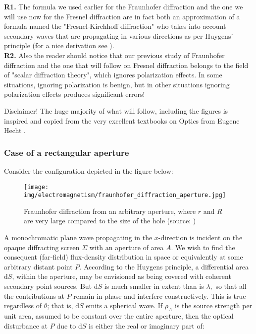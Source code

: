 	\begin{tcolorbox}[title=Remarks,colframe=black,arc=10pt]
	\textbf{R1.} The formula we used earlier for the Fraunhofer diffraction and the one we will use now for the Fresnel diffraction are in fact both an approximation of a formula named the "Fresnel-Kirchhoff diffraction" who takes into account secondary waves that are propagating in various directions as per Huygens' principle (for a nice derivation see \cite{ware2015physics}).\\
	
	\textbf{R2.} Also the reader should notice that our previous study of Fraunhofer diffraction and the one that will follow on Fresnel diffraction belongs to the field of "scalar diffraction theory", which ignores polarization effects. In some situations, ignoring polarization is benign, but in other situations ignoring polarization effects produces significant errors!
	\end{tcolorbox}
	
	Disclaimer! The huge majority of what will follow, including the figures is inspired and copied from the very excellent textbooks on Optics from Eugene Hecht \cite{hecht2016optics}.
	
	\subsubsection{Case of a rectangular aperture}\label{fresnel rectangular aperture}
	Consider the configuration depicted in the figure below:
	\begin{figure}[H]
		\centering
		\texttt{[image: img/electromagnetism/fraunhofer\_diffraction\_aperture.jpg]}
		\caption[]{Fraunhofer diffraction from an arbitrary aperture, where $r$ and $R$ are very large compared to the size of the hole (source: \cite{hecht2016optics})}
	\end{figure}
	 A monochromatic plane wave propagating in the $x$-direction is incident on the opaque diffracting screen $\Sigma$ with an aperture of area $A$. We wish to find the consequent (far-field) flux-density distribution in space or equivalently at some arbitrary distant point $P$. According to the Huygens principle, a differential area $\mathrm{d}S$, within the aperture, may be envisioned as being covered with coherent secondary point sources. But $\mathrm{d} S$ is much smaller in extent than is $\lambda,$ so that all the contributions at $P$ remain in-phase and interfere constructively. This is true regardless of $\theta$; that is, $\mathrm{d}S$ emits a spherical wave. If $\rho_{A}$ is the source strength per unit area, assumed to be constant over the entire aperture, then the optical disturbance at $P$ due to $\mathrm{d}S$  is either the real or imaginary part of:
	 
